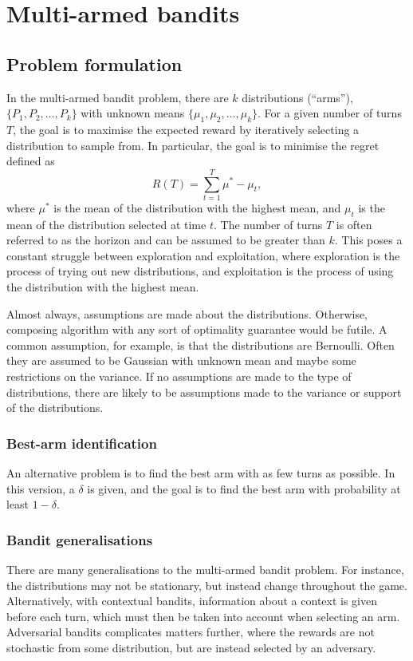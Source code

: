 \chapter{Multi-armed bandits}
\label{chap:bandits}

\section{Problem formulation}
In the multi-armed bandit problem, there are $k$ distributions (\enquote{arms}), $\{P_1, P_2,\dots,P_k\}$ with unknown means $\{\mu_1, \mu_2,\dots,\mu_k\}$.
For a given number of turns $T$, the goal is to maximise the expected reward by iteratively selecting a distribution to sample from.
In particular, the goal is to minimise the regret defined as
\begin{equation}
    R(T) = \sum_{t=1}^T \mu^* - \mu_t,
\end{equation}
where $\mu^*$ is the mean of the distribution with the highest mean, and $\mu_t$ is the mean of the distribution selected at time $t$.
The number of turns $T$ is often referred to as the horizon and can be assumed to be greater than $k$.
This poses a constant struggle between exploration and exploitation, where exploration is the process of trying out new distributions, and exploitation is the process of using the distribution with the highest mean.

Almost always, assumptions are made about the distributions.
Otherwise, composing algorithm with any sort of optimality guarantee would be futile.
A common assumption, for example, is that the distributions are Bernoulli.
Often they are assumed to be Gaussian with unknown mean and maybe some restrictions on the variance.
If no assumptions are made to the type of distributions, there are likely to be assumptions made to the variance or support of the distributions.

\subsection{Best-arm identification}
An alternative problem is to find the best arm with as few turns as possible.
In this version, a $\delta$ is given, and the goal is to find the best arm with probability at least $1-\delta$.

\subsection{Bandit generalisations}
There are many generalisations to the multi-armed bandit problem.
For instance, the distributions may not be stationary, but instead change throughout the game.
Alternatively, with contextual bandits, information about a context is given before each turn, which must then be taken into account when selecting an arm.
Adversarial bandits complicates matters further, where the rewards are not stochastic from some distribution, but are instead selected by an adversary.


